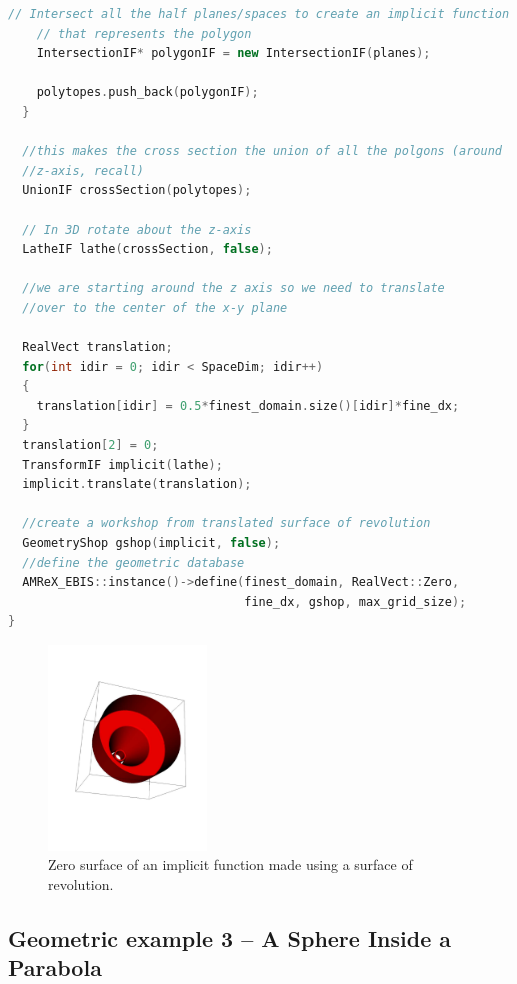 \begin{lstlisting}[language=cpp]
    // Intersect all the half planes/spaces to create an implicit function
    // that represents the polygon
    IntersectionIF* polygonIF = new IntersectionIF(planes);

    polytopes.push_back(polygonIF);
  }

  //this makes the cross section the union of all the polgons (around
  //z-axis, recall)
  UnionIF crossSection(polytopes);
            
  // In 3D rotate about the z-axis 
  LatheIF lathe(crossSection, false);

  //we are starting around the z axis so we need to translate
  //over to the center of the x-y plane
            
  RealVect translation;
  for(int idir = 0; idir < SpaceDim; idir++)
  {
    translation[idir] = 0.5*finest_domain.size()[idir]*fine_dx;
  }
  translation[2] = 0;
  TransformIF implicit(lathe);
  implicit.translate(translation);

  //create a workshop from translated surface of revolution
  GeometryShop gshop(implicit, false);
  //define the geometric database
  AMReX_EBIS::instance()->define(finest_domain, RealVect::Zero,
                                 fine_dx, gshop, max_grid_size);
}

\end{lstlisting}

\begin{figure}[h]
  \centering
  \includegraphics[width=0.375\textwidth]{./EB/revolution.pdf}
  \caption{\label{fig::revolution} Zero surface of an implicit
    function made using a surface of revolution.}
\end{figure}
\subsection{Geometric example 3 -- A Sphere Inside a Parabola}

